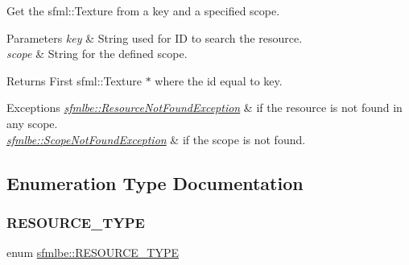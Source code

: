 Get the sfml\+::\+Texture from a key and a specified scope. 
\begin{DoxyParams}{Parameters}
{\em key} & String used for ID to search the resource. \\
\hline
{\em scope} & String for the defined scope. \\
\hline
\end{DoxyParams}
\begin{DoxyReturn}{Returns}
First sfml\+::\+Texture $\ast$ where the id equal to key. 
\end{DoxyReturn}

\begin{DoxyExceptions}{Exceptions}
{\em \mbox{\hyperlink{classsfmlbe_1_1_resource_not_found_exception}{sfmlbe\+::\+Resource\+Not\+Found\+Exception}}} & if the resource is not found in any scope. \\
\hline
{\em \mbox{\hyperlink{classsfmlbe_1_1_scope_not_found_exception}{sfmlbe\+::\+Scope\+Not\+Found\+Exception}}} & if the scope is not found. \\
\hline
\end{DoxyExceptions}


\subsection{Enumeration Type Documentation}
\mbox{\label{group___t_e_s_t___g_r_o_u_p_gac4335ed3060bba025f73e01f9dccb2dd}} 
\subsubsection{\texorpdfstring{R\+E\+S\+O\+U\+R\+C\+E\+\_\+\+T\+Y\+PE}{RESOURCE\_TYPE}}
{\footnotesize\ttfamily enum \mbox{\hyperlink{group___t_e_s_t___g_r_o_u_p_gac4335ed3060bba025f73e01f9dccb2dd}{sfmlbe\+::\+R\+E\+S\+O\+U\+R\+C\+E\+\_\+\+T\+Y\+PE}}}

